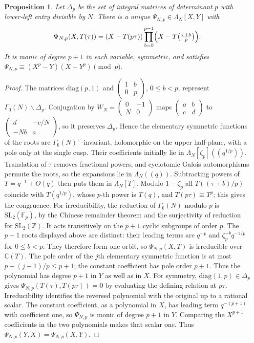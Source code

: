 \documentclass[11pt,a4paper]{article}
\numberwithin{equation}{section}
\newtheorem{proposition}[theorem]{Proposition}
\theoremstyle{definition}
\theoremstyle{remark}
\newcommand{\Fp}{\mathbb F_p}
\newcommand{\Z}{\mathbb Z}
\begin{document}
\begin{proposition}\label{prop:Psi}
Let $\Delta_p$ be the set of integral matrices of determinant $p$ with lower-left entry divisible by
$N$. There is a unique $\Psi_{N,p}\in\Lambda_N[X,Y]$ with
\[
\Psi_{N,p}(X,T(\tau))=(X-T(p\tau))\prod_{b=0}^{p-1}\Bigl(X-T\bigl(\tfrac{\tau+b}{p}\bigr)\Bigr).
\]
It is monic of degree $p+1$ in each variable, symmetric, and satisfies
$\Psi_{N,p}\equiv(X^p-Y)(X-Y^p)\pmod p$.
\end{proposition}
\begin{proof}
The matrices $\mathrm{diag}(p,1)$ and $\begin{pmatrix}1&b\\0&p\end{pmatrix}$, $0\le b<p$, represent
$\Gamma_0(N)\backslash\Delta_p$. Conjugation by $W_N=\begin{pmatrix}0&-1\\N&0\end{pmatrix}$ maps
$\begin{pmatrix}a&b\\c&d\end{pmatrix}$ to $\begin{pmatrix}d&-c/N\\-Nb&a\end{pmatrix}$, so it preserves
$\Delta_p$. Hence the elementary symmetric functions of the roots are $\Gamma_0(N)^+$-invariant,
holomorphic on the upper half-plane, with a pole only at the single cusp.
Their coefficients initially lie in $\Lambda_N[\zeta_p]((q^{1/p}))$.
Translation of $\tau$ removes fractional powers, and cyclotomic Galois automorphisms
permute the roots, so the expansions lie in $\Lambda_N((q))$.
Subtracting powers of $T=q^{-1}+O(q)$ then puts them in $\Lambda_N[T]$. Modulo $1-\zeta_p$ all $T((\tau+b)/p)$ coincide with $T(q^{1/p})$, whose $p$-th power is $T(q)$, and
$T(p\tau)\equiv T^p$; this gives the congruence. For irreducibility, the reduction of $\Gamma_0(N)$ modulo $p$ is
$\mathrm{SL}_2(\Fp)$, by the Chinese remainder theorem and the surjectivity of reduction
for $\mathrm{SL}_2(\Z)$. It acts transitively on the $p+1$ cyclic subgroups of order $p$.
The $p+1$ roots displayed above are distinct: their leading terms are $q^{-p}$ and
$\zeta_p^{-b}q^{-1/p}$ for $0\le b<p$. They therefore form one orbit, so
$\Psi_{N,p}(X,T)$ is irreducible over $\mathbb C(T)$.
The pole order of the $j$th elementary symmetric function is at most
$p+(j-1)/p\le p+1$; the constant coefficient has pole order $p+1$.
Thus the polynomial has degree $p+1$ in $Y$ as well as in $X$.
For symmetry, $\mathrm{diag}(1,p)\in\Delta_p$ gives
$\Psi_{N,p}(T(\tau),T(p\tau))=0$ by evaluating the defining relation at $p\tau$.
Irreducibility identifies the reversed polynomial with the original
up to a rational scalar. The constant coefficient, as a polynomial in
$X$, has leading term $q^{-(p+1)}$ with coefficient one, so
$\Psi_{N,p}$ is monic of degree $p+1$ in $Y$. Comparing the
$X^{p+1}$ coefficients in the two polynomials makes that scalar one.
Thus $\Psi_{N,p}(Y,X)=\Psi_{N,p}(X,Y)$.
\end{proof}
\end{document}
